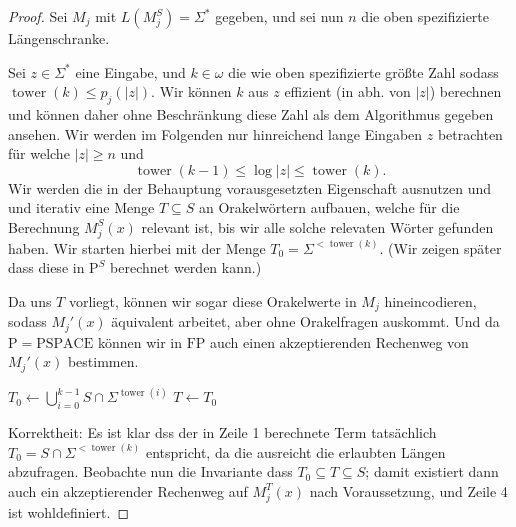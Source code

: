 \documentclass[nofonts]{uebung}
\theoremstyle{definition}
\def\P{\ensuremath{\mathrm{P}}}
\def\FP{\ensuremath{\mathrm{FP}}}
\def\PSPACE{\ensuremath{\mathrm{PSPACE}}}
\DeclareMathOperator{\tower}{tower}
\begin{document}
\begin{proof}
    Sei $M_j$ mit $L(M_j^S)=\Sigma^*$ gegeben, und sei nun $n$ die oben spezifizierte Längenschranke.

    Sei $z\in\Sigma^*$ eine Eingabe, und $k\in\omega$ die wie oben spezifizierte größte Zahl sodass $\tower(k)\leq p_j(|z|)$. Wir können $k$ aus $z$ effizient (in abh. von $|z|$) berechnen und können daher ohne Beschränkung diese Zahl als dem Algorithmus gegeben ansehen.
    Wir werden im Folgenden nur hinreichend lange Eingaben $z$ betrachten für welche $|z|\geq n$ und 
    \[ \tower(k-1) \leq \log|z| \leq \tower(k). \]
    Wir werden die in der Behauptung vorausgesetzten  Eigenschaft ausnutzen und und iterativ eine Menge $T\subseteq S$ an Orakelwörtern aufbauen, welche für die Berechnung $M_j^S(x)$ relevant ist, bis wir alle solche relevaten Wörter gefunden haben. Wir starten hierbei mit der Menge $T_0=\Sigma^{<\tower(k)}$. (Wir zeigen später dass diese in $\P^S$ berechnet werden kann.)

    Da uns $T$ vorliegt, können wir sogar diese Orakelwerte in $M_j$ hineincodieren, sodass $M_j'(x)$ äquivalent arbeitet, aber ohne Orakelfragen auskommt. Und da $\P=\PSPACE$ können wir in $\FP$ auch einen akzeptierenden Rechenweg von $M_j'(x)$ bestimmen.

    \noindent
    \begin{algorithm}[H]
        $T_0\gets \bigcup_{i=0}^{k-1} S\cap\Sigma^{\tower(i)}$\;
        $T\gets T_0$\;
    \end{algorithm}

    Korrektheit: Es ist klar dss der in  Zeile 1 berechnete Term tatsächlich $T_0=S\cap\Sigma^{<\tower(k)}$ entspricht, da die ausreicht die erlaubten Längen abzufragen. Beobachte nun die Invariante dass $T_0\subseteq T\subseteq S$; damit existiert dann auch ein akzeptierender Rechenweg auf $M_j^{T}(x)$ nach Voraussetzung, und Zeile 4 ist wohldefiniert.


\end{proof}
\end{document}

